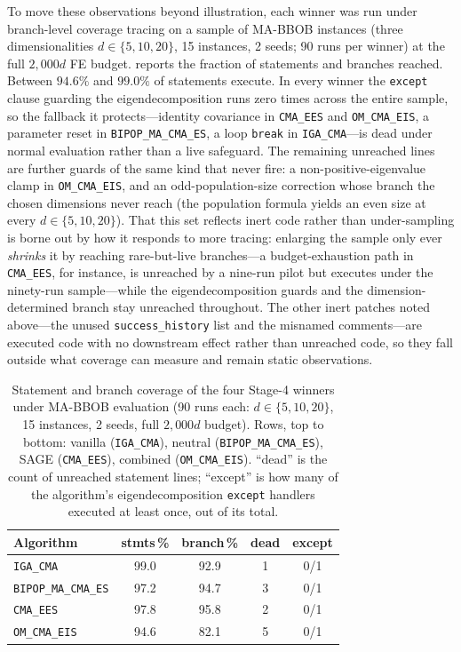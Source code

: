 To move these observations beyond illustration, each winner was run under branch-level coverage tracing on a sample of MA-BBOB instances (three dimensionalities $d \in \{5, 10, 20\}$, 15 instances, 2 seeds; 90 runs per winner) at the full $2{,}000d$ FE budget.  reports the fraction of statements and branches reached. Between $94.6\%$ and $99.0\%$ of statements execute. In every winner the \texttt{except} clause guarding the eigendecomposition runs zero times across the entire sample, so the fallback it protects---identity covariance in \texttt{CMA\_EES} and \texttt{OM\_CMA\_EIS}, a parameter reset in \texttt{BIPOP\_MA\_CMA\_ES}, a loop \texttt{break} in \texttt{IGA\_CMA}---is dead under normal evaluation rather than a live safeguard. The remaining unreached lines are further guards of the same kind that never fire: a non-positive-eigenvalue clamp in \texttt{OM\_CMA\_EIS}, and an odd-population-size correction whose branch the chosen dimensions never reach (the population formula yields an even size at every $d \in \{5,10,20\}$). That this set reflects inert code rather than under-sampling is borne out by how it responds to more tracing: enlarging the sample only ever \emph{shrinks} it by reaching rare-but-live branches---a budget-exhaustion path in \texttt{CMA\_EES}, for instance, is unreached by a nine-run pilot but executes under the ninety-run sample---while the eigendecomposition guards and the dimension-determined branch stay unreached throughout. The other inert patches noted above---the unused \texttt{success\_history} list and the misnamed comments---are executed code with no downstream effect rather than unreached code, so they fall outside what coverage can measure and remain static observations.

\begin{table}[t]
\centering
\small
\caption{Statement and branch coverage of the four Stage-4 winners under MA-BBOB evaluation (90 runs each: $d \in \{5,10,20\}$, 15 instances, 2 seeds, full $2{,}000d$ budget). Rows, top to bottom: vanilla (\texttt{IGA\_CMA}), neutral (\texttt{BIPOP\_MA\_CMA\_ES}), SAGE (\texttt{CMA\_EES}), combined (\texttt{OM\_CMA\_EIS}). ``dead'' is the count of unreached statement lines; ``except'' is how many of the algorithm's eigendecomposition \texttt{except} handlers executed at least once, out of its total.}
\label{tab:winner-coverage}
\setlength{\tabcolsep}{5pt}
\begin{tabular}{@{}lcccc@{}}
\toprule
\textbf{Algorithm} & \textbf{stmts\,\%} & \textbf{branch\,\%} & \textbf{dead} & \textbf{except} \\
\midrule
\texttt{IGA\_CMA}            & 99.0 & 92.9 & 1 & 0/1 \\
\texttt{BIPOP\_MA\_CMA\_ES}   & 97.2 & 94.7 & 3 & 0/1 \\
\texttt{CMA\_EES}            & 97.8 & 95.8 & 2 & 0/1 \\
\texttt{OM\_CMA\_EIS}         & 94.6 & 82.1 & 5 & 0/1 \\
\bottomrule
\end{tabular}
\end{table}


